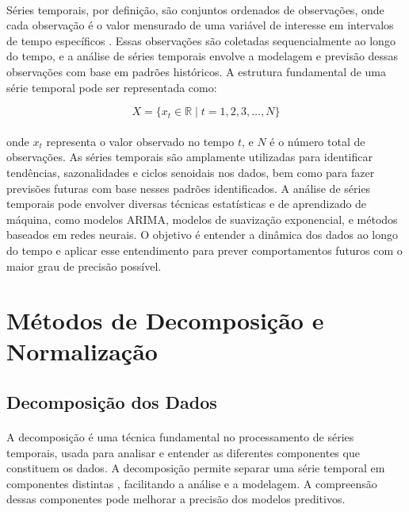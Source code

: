 \paragraph{} Séries temporais, por definição, são conjuntos ordenados de observações, onde cada observação é o valor mensurado de uma variável de interesse em intervalos de tempo específicos \cite{box2016time}. Essas observações são coletadas sequencialmente ao longo do tempo, e a análise de séries temporais envolve a modelagem e previsão dessas observações com base em padrões históricos. A estrutura fundamental de uma série temporal pode ser representada como:

\begin{equation}
	X = \{x_t \in \mathbb{R} \mid t = 1,2,3, \ldots, N\}
\end{equation}

\paragraph{} onde \( x_t \) representa o valor observado no tempo \( t \), e \( N \) é o número total de observações. As séries temporais são amplamente utilizadas para identificar tendências, sazonalidades e ciclos senoidais nos dados, bem como para fazer previsões futuras com base nesses padrões identificados. A análise de séries temporais pode envolver diversas técnicas estatísticas e de aprendizado de máquina, como modelos ARIMA, modelos de suavização exponencial, e métodos baseados em redes neurais. O objetivo é entender a dinâmica dos dados ao longo do tempo e aplicar esse entendimento para prever comportamentos futuros com o maior grau de precisão possível.

\section{Métodos de Decomposição e Normalização}

\subsection{Decomposição dos Dados}
\paragraph{} A decomposição é uma técnica fundamental no processamento de séries temporais, usada para analisar e entender as diferentes componentes que constituem os dados. A decomposição permite separar uma série temporal em componentes distintas \cite{Faier11}, facilitando a análise e a modelagem. A compreensão dessas componentes pode melhorar a precisão dos modelos preditivos.
